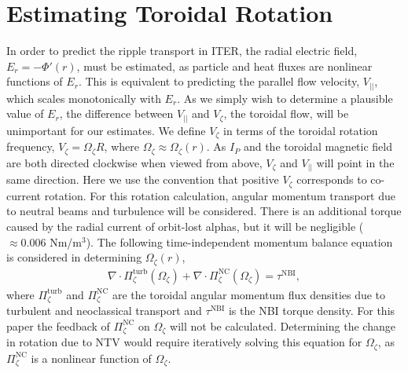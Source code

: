 \documentclass[aip, pop, preprint]{revtex4-1}
\numberwithin{figure}{section}
\numberwithin{equation}{section}
\begin{document}
\FloatBarrier

\section{Estimating Toroidal Rotation}\label{rotation}

In order to predict the ripple transport in ITER, the radial electric field, $E_r = - \Phi'(r) $, must be estimated, as particle and heat fluxes are nonlinear functions of $E_r$. This is equivalent to predicting the parallel flow velocity, $V_{||}$, which scales monotonically with $E_r$.  As we simply wish to determine a plausible value of $E_r$, the difference between $V_{||}$ and $V_{\zeta}$, the toroidal flow, will be unimportant for our estimates. We define $V_{\zeta}$ in terms of the toroidal rotation frequency, $V_{\zeta} = \Omega_{\zeta} R$, where $\Omega_{\zeta} \approx \Omega_{\zeta}(r)$. As $I_P$ and the toroidal magnetic field are both directed clockwise when viewed from above, $V_{\zeta}$ and $V_{||}$ will point in the same direction. Here we use the convention that positive $V_{\zeta}$ corresponds to co-current rotation. For this rotation calculation, angular momentum transport due to neutral beams and turbulence will be considered. There is an additional torque caused by the radial current of orbit-lost alphas,\cite{Rosenbluth1996} but it will be negligible ($\approx 0.006$ Nm/m$^3$). The following time-independent momentum balance equation is considered in determining $\Omega_{\zeta}(r)$,
\begin{gather}
\nabla \cdot \Pi_{\zeta}^{\mathrm{turb}}(\Omega_{\zeta}) + \nabla \cdot \Pi_{\zeta}^{\mathrm{NC}}(\Omega_{\zeta}) = \tau^{\mathrm{NBI}},
\end{gather}
where $\Pi^{\mathrm{turb}}_{\zeta}$ and $\Pi^{\mathrm{NC}}_{\zeta}$ are the toroidal angular momentum flux densities due to turbulent and neoclassical transport and $\tau^{\mathrm{NBI}}$ is the NBI torque density. For this paper the feedback of $\Pi_{\zeta}^{\mathrm{NC}}$ on $\Omega_{\zeta}$ will not be calculated. Determining the change in rotation due to NTV would require iteratively solving this equation for $\Omega_{\zeta}$, as $\Pi_{\zeta}^{\mathrm{NC}}$ is a nonlinear function of $\Omega_{\zeta}$. 
\end{document}
